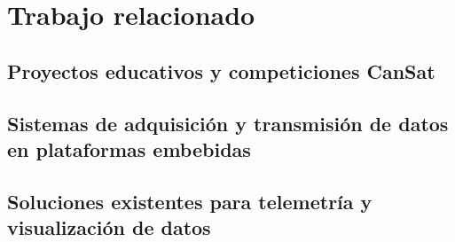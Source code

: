 \chapter{Trabajo relacionado}
\label{cap:trabajorRelacionado}

\section{Proyectos educativos y competiciones CanSat}

\section{Sistemas de adquisición y transmisión de datos en plataformas embebidas}

\section{Soluciones existentes para telemetría y visualización de datos}